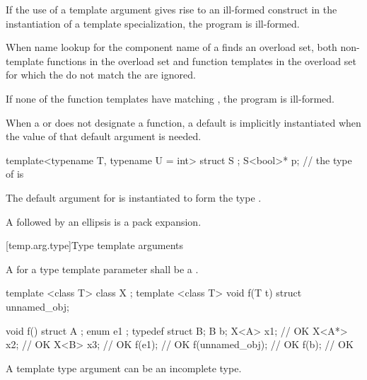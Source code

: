 \pnum
If the use of a template argument
gives rise to an ill-formed construct in the instantiation of a
template specialization, the program is ill-formed.

\pnum
When name lookup for the component name of a
finds an overload set, both non-template functions in the overload
set and function templates in the overload set for
which the
do not match the
are ignored.
\begin{note}
If none of the function templates have matching
,
the program is ill-formed.
\end{note}

\pnum
When a  or
does not designate a function,
a default  is
implicitly instantiated
when the value of that default argument is needed.
\begin{example}
\begin{codeblock}
template<typename T, typename U = int> struct S { };
S<bool>* p;         // the type of  is 
\end{codeblock}
The default argument for  is instantiated to form the type .
\end{example}

\pnum
A  followed by an ellipsis is
a pack expansion.

[temp.arg.type]{Type template arguments}

\pnum
A
for a type template parameter
shall be a
.

\pnum
\begin{example}
\begin{codeblock}
template <class T> class X { };
template <class T> void f(T t) { }
struct { } unnamed_obj;

void f() {
  struct A { };
  enum { e1 };
  typedef struct { } B;
  B b;
  X<A> x1;          // OK
  X<A*> x2;         // OK
  X<B> x3;          // OK
  f(e1);            // OK
  f(unnamed_obj);   // OK
  f(b);             // OK
}
\end{codeblock}
\end{example}
\begin{note}
A template type argument can be an incomplete type.
\end{note}

